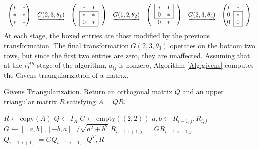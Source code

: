 \def\mc#1{\multicolumn{1}{c|}{#1}}
\def\lc#1{\multicolumn{1}{|c}{#1}}
\[
\begin{array}{ccccccc}
\begin{pmatrix}
*&*\\
*&*\\
*&*
\end{pmatrix}
&
\underrightarrow{G(2,3,\theta_1)}
&\begin{pmatrix}
&*&*&\\ \cline{2-3}
&\lc{*}&\mc{*}&\\
&\lc{0}&\mc{*}& \\ \cline{2-3}
\end{pmatrix}
&
\underrightarrow{G(1,2,\theta_2)}
& \begin{pmatrix} \cline{2-3}
&\lc{*}&\mc{*}&\\
&\lc{0}&\mc{*}&\\ \cline{2-3}
&0&*&
\end{pmatrix}
&
\underrightarrow{G(2,3,\theta_3)}
&\begin{pmatrix}
*&*&\\ \cline{2-2}
\mc{0}&\mc{*}&\\
\mc{0}&\mc{0}&\\ \cline{2-2}
\end{pmatrix}
\end{array}
\]
At each stage, the boxed entries are those modified by the previous transformation. 
The final transformation $G(2,3,\theta_3)$ operates on the bottom two rows, but since the first two entries are zero, they are unaffected. 
Assuming that at the $ij^{th}$ stage of the algorithm, $a_{ij}$ is nonzero, Algorithm \ref{Alg:givens} computes the Givens triangularization of a matrix..


\begin{algorithm}
\begin{algorithmic}[1]
\caption{Givens Triangularization. Return an orthogonal matrix $Q$ and an upper triangular matrix $R$ satisfying $A = QR$.}
\label{Alg:givens}
\State $R \gets \text{copy}(A)$
\State $Q \gets I_A$
\State $G \gets \text{empty}((2,2))$
      \State $a, b \gets R_{i-1,j}, R_{i,j}$
      \State $G \gets [[a, b],[-b,a]]/\sqrt{a^2+b^2}$
      \State $R_{i-1:i+1, j:} = GR_{i-1:i+1, j:}$
      \State $Q_{i-1:i+1,:} = GQ_{i-1:i+1,:}$
    \EndFor
\EndFor
\State {} $Q^T, R$
\EndProcedure
\end{algorithmic}
\end{algorithm}

